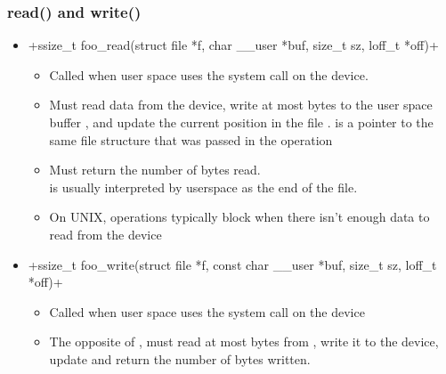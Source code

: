 \begin{frame}[fragile]
  \frametitle{read() and write()}
  \begin{itemize}
  \item {}+ssize_t foo_read(struct file *f, char __user *buf, size_t sz, loff_t *off)+
    \begin{itemize}
    \item Called when user space uses the  system call on
      the device.
    \item Must read data from the device, write at most 
      bytes to the user space buffer , and update the
      current position in the file .  is a pointer
      to the same file structure that was passed in the 
      operation
    \item Must return the number of bytes read.\\
           is usually interpreted by userspace as the end of
          the file.
    \item On UNIX,  operations typically block when there
      isn't enough data to read from the device
    \end{itemize}
  \item {}+ssize_t foo_write(struct file *f, const char __user *buf, size_t sz, loff_t *off)+
    \begin{itemize}
    \item Called when user space uses the  system call
      on the device
    \item The opposite of , must read at most 
      bytes from , write it to the device, update 
      and return the number of bytes written.
    \end{itemize}
  \end{itemize}
\end{frame}

